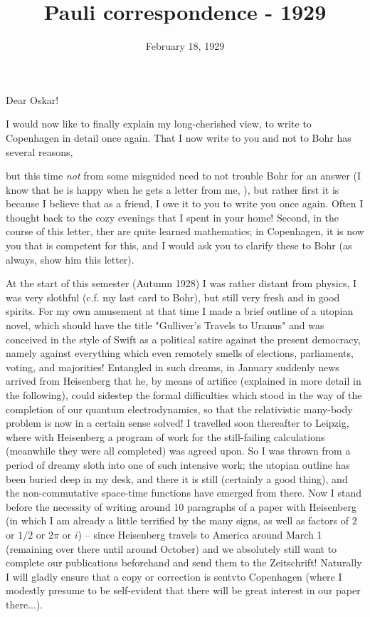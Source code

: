 \documentclass{article}
\title{Pauli correspondence - 1929}
\newcommand{\nf}[2]{
\newcommand{#1}[1]{#2}
}
\begin{document}
\date{February 18, 1929}


\nf{\Div}{\operatorfont{Div}{#1}}

Dear Oskar!

I would now like to finally explain my long-cherished view, to write to Copenhagen in detail once again. That I now write to you and not to Bohr has several reasons, 

but this time \textit{not} from some misguided need to not trouble Bohr for an answer (I know that he is  happy when he gets a letter from me, ), but rather first it is because I believe that as a friend, I owe it to you to write you once again. Often I thought back to the cozy evenings that I spent in your home! Second, in the course of this letter, ther are quite learned mathematics; in Copenhagen, it is now you that is competent for this, and I would ask you to clarify these to Bohr (as always, show him this letter).

At the start of this semester (Autumn 1928) I was rather distant from physics, I was very slothful (c.f. my last card to Bohr), but still very fresh and in good spirits. For my own amusement at that time I made a brief outline of a utopian novel, which should have the title "Gulliver's Travels to Uranus" and was conceived in the style of Swift as a political satire against the present democracy, namely against everything which even remotely smells of elections, parliaments, voting, and majorities! Entangled in such dreams, in January suddenly news arrived from Heisenberg that he, by means of artifice (explained in more detail in the following), could sidestep the formal difficulties which stood in the way of the completion of our quantum electrodynamics, so that the relativistic many-body problem is now in a certain sense solved! I travelled soon thereafter to Leipzig, where with Heisenberg a program of work for the still-failing calculations (meanwhile they were all completed) was agreed upon. So I was thrown from a period of dreamy sloth into one of such intensive work; the utopian outline has been buried deep in my desk, and there it is still (certainly a good thing), and the non-commutative space-time functions have emerged from there. Now I stand before the necessity of writing around 10 paragraphs of a paper with Heisenberg (in which I am already a little terrified by the many signs, as well as factors of $2$ or $1/2$ or $2\pi$ or $i$) -- since Heisenberg travels to America around March 1 (remaining over there until around October) and we absolutely still want to complete our publications beforehand and send them to the Zeitschrift! Naturally I will gladly ensure that a copy or correction is sentvto Copenhagen (where I modestly presume to be self-evident that there will be great interest in our paper there...).
\end{document}
